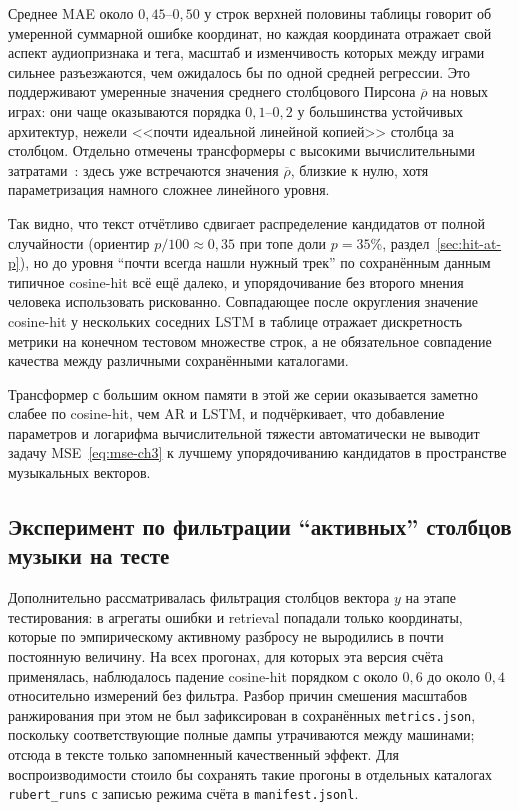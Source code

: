 Среднее MAE около $0{,}45$--$0{,}50$ у строк верхней половины таблицы говорит об умеренной суммарной ошибке координат, но каждая координата отражает свой аспект аудиопризнака и тега, масштаб и изменчивость которых между играми сильнее разъезжаются, чем ожидалось бы по одной средней регрессии. Это поддерживают умеренные значения среднего столбцового Пирсона $\overline{\rho}$ на новых играх: они чаще оказываются порядка $0{,}1$--$0{,}2$ у большинства устойчивых архитектур, нежели <<почти идеальной линейной копией>> столбца за столбцом. Отдельно отмечены трансформеры с высокими вычислительными затратами~\cite{vaswani2017}: здесь уже встречаются значения $\overline{\rho}$, близкие к нулю, хотя параметризация намного сложнее линейного уровня.

Так видно, что текст отчётливо сдвигает распределение кандидатов от полной случайности (ориентир $p/100\approx 0{,}35$ при топе доли $p=35$\%, раздел~\ref{sec:hit-at-p}), но до уровня ``почти всегда нашли нужный трек'' по сохранённым данным типичное cosine-hit всё ещё далеко, и упорядочивание без второго мнения человека использовать рискованно. Совпадающее после округления значение cosine-hit у нескольких соседних LSTM в таблице отражает дискретность метрики на конечном тестовом множестве строк, а не обязательное совпадение качества между различными сохранёнными каталогами.

Трансформер с большим окном памяти в этой же серии оказывается заметно слабее по cosine-hit, чем AR и LSTM, и подчёркивает, что добавление параметров и логарифма вычислительной тяжести автоматически не выводит задачу MSE~\eqref{eq:mse-ch3} к лучшему упорядочиванию кандидатов в пространстве музыкальных векторов.

\subsection{Эксперимент по фильтрации ``активных'' столбцов музыки на тесте}

Дополнительно рассматривалась фильтрация столбцов вектора $y$ на этапе тестирования: в агрегаты ошибки и retrieval попадали только координаты, которые по эмпирическому активному разбросу не выродились в почти постоянную величину. На всех прогонах, для которых эта версия счёта применялась, наблюдалось падение cosine-hit порядком с около $0{,}6$ до около $0{,}4$ относительно измерений без фильтра. Разбор причин смешения масштабов ранжирования при этом не был зафиксирован в сохранённых \texttt{metrics.json}, поскольку соответствующие полные дампы утрачиваются между машинами; отсюда в тексте только запомненный качественный эффект. Для воспроизводимости стоило бы сохранять такие прогоны в отдельных каталогах \texttt{rubert\_runs} с записью режима счёта в \texttt{manifest.jsonl}.


